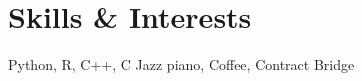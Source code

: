 \section{Skills \& Interests}
\resumeSectionStart

\skillsInterests
    {Python, R, C++, C}
    {Jazz piano, Coffee, Contract Bridge}

\resumeSectionEnd